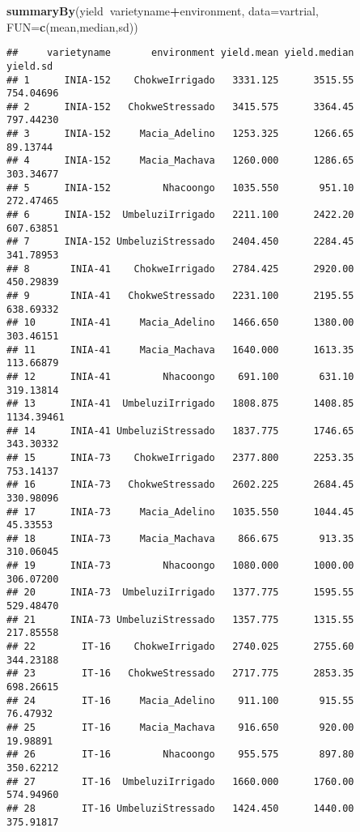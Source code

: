 \documentclass[]{book}
\newenvironment{Shaded}{\begin{snugshade}}{\end{snugshade}}
\newcommand{\KeywordTok}[1]{\textcolor[rgb]{0.13,0.29,0.53}{\textbf{#1}}}
\newcommand{\DataTypeTok}[1]{\textcolor[rgb]{0.13,0.29,0.53}{#1}}
\newcommand{\OperatorTok}[1]{\textcolor[rgb]{0.81,0.36,0.00}{\textbf{#1}}}
\newcommand{\NormalTok}[1]{#1}
\theoremstyle{definition}
\theoremstyle{definition}
\theoremstyle{definition}
\theoremstyle{remark}
\begin{document}
\begin{Shaded}
\begin{Highlighting}[]
\KeywordTok{summaryBy}\NormalTok{(yield}\OperatorTok{~}\NormalTok{varietyname}\OperatorTok{+}\NormalTok{environment, }\DataTypeTok{data=}\NormalTok{vartrial, }\DataTypeTok{FUN=}\KeywordTok{c}\NormalTok{(mean,median,sd))}
\end{Highlighting}
\end{Shaded}

\begin{verbatim}
##     varietyname       environment yield.mean yield.median   yield.sd
## 1      INIA-152    ChokweIrrigado   3331.125      3515.55  754.04696
## 2      INIA-152   ChokweStressado   3415.575      3364.45  797.44230
## 3      INIA-152     Macia_Adelino   1253.325      1266.65   89.13744
## 4      INIA-152     Macia_Machava   1260.000      1286.65  303.34677
## 5      INIA-152         Nhacoongo   1035.550       951.10  272.47465
## 6      INIA-152  UmbeluziIrrigado   2211.100      2422.20  607.63851
## 7      INIA-152 UmbeluziStressado   2404.450      2284.45  341.78953
## 8       INIA-41    ChokweIrrigado   2784.425      2920.00  450.29839
## 9       INIA-41   ChokweStressado   2231.100      2195.55  638.69332
## 10      INIA-41     Macia_Adelino   1466.650      1380.00  303.46151
## 11      INIA-41     Macia_Machava   1640.000      1613.35  113.66879
## 12      INIA-41         Nhacoongo    691.100       631.10  319.13814
## 13      INIA-41  UmbeluziIrrigado   1808.875      1408.85 1134.39461
## 14      INIA-41 UmbeluziStressado   1837.775      1746.65  343.30332
## 15      INIA-73    ChokweIrrigado   2377.800      2253.35  753.14137
## 16      INIA-73   ChokweStressado   2602.225      2684.45  330.98096
## 17      INIA-73     Macia_Adelino   1035.550      1044.45   45.33553
## 18      INIA-73     Macia_Machava    866.675       913.35  310.06045
## 19      INIA-73         Nhacoongo   1080.000      1000.00  306.07200
## 20      INIA-73  UmbeluziIrrigado   1377.775      1595.55  529.48470
## 21      INIA-73 UmbeluziStressado   1357.775      1315.55  217.85558
## 22        IT-16    ChokweIrrigado   2740.025      2755.60  344.23188
## 23        IT-16   ChokweStressado   2717.775      2853.35  698.26615
## 24        IT-16     Macia_Adelino    911.100       915.55   76.47932
## 25        IT-16     Macia_Machava    916.650       920.00   19.98891
## 26        IT-16         Nhacoongo    955.575       897.80  350.62212
## 27        IT-16  UmbeluziIrrigado   1660.000      1760.00  574.94960
## 28        IT-16 UmbeluziStressado   1424.450      1440.00  375.91817

\end{verbatim}
\end{document}
